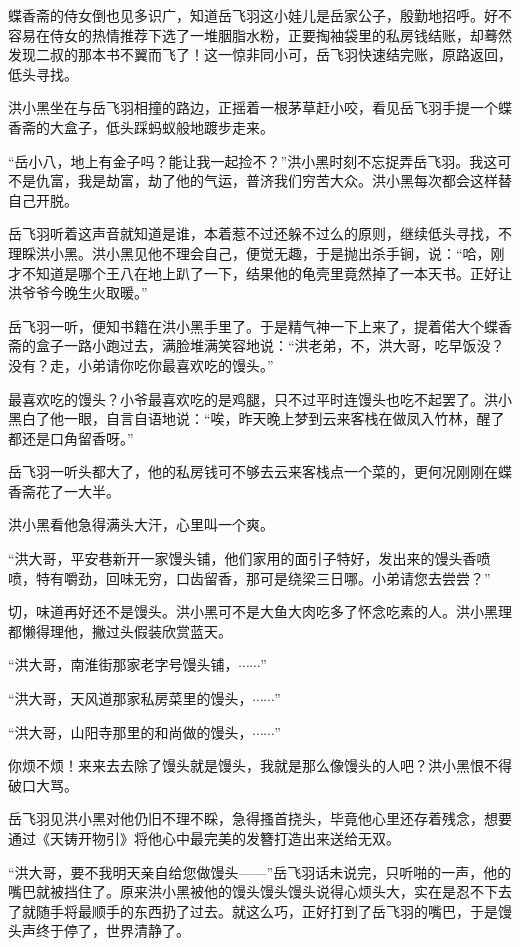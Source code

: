 蝶香斋的侍女倒也见多识广，知道岳飞羽这小娃儿是岳家公子，殷勤地招呼。好不容易在侍女的热情推荐下选了一堆胭脂水粉，正要掏袖袋里的私房钱结账，却蓦然发现二叔的那本书不翼而飞了！这一惊非同小可，岳飞羽快速结完账，原路返回，低头寻找。

洪小黑坐在与岳飞羽相撞的路边，正摇着一根茅草赶小咬，看见岳飞羽手提一个蝶香斋的大盒子，低头踩蚂蚁般地踱步走来。

“岳小八，地上有金子吗？能让我一起捡不？”洪小黑时刻不忘捉弄岳飞羽。我这可不是仇富，我是劫富，劫了他的气运，普济我们穷苦大众。洪小黑每次都会这样替自己开脱。

岳飞羽听着这声音就知道是谁，本着惹不过还躲不过么的原则，继续低头寻找，不理睬洪小黑。洪小黑见他不理会自己，便觉无趣，于是抛出杀手锏，说：“哈，刚才不知道是哪个王八在地上趴了一下，结果他的龟壳里竟然掉了一本天书。正好让洪爷爷今晚生火取暖。”

岳飞羽一听，便知书籍在洪小黑手里了。于是精气神一下上来了，提着偌大个蝶香斋的盒子一路小跑过去，满脸堆满笑容地说：“洪老弟，不，洪大哥，吃早饭没？没有？走，小弟请你吃你最喜欢吃的馒头。”

最喜欢吃的馒头？小爷最喜欢吃的是鸡腿，只不过平时连馒头也吃不起罢了。洪小黑白了他一眼，自言自语地说：“唉，昨天晚上梦到云来客栈在做凤入竹林，醒了都还是口角留香呀。”

岳飞羽一听头都大了，他的私房钱可不够去云来客栈点一个菜的，更何况刚刚在蝶香斋花了一大半。

洪小黑看他急得满头大汗，心里叫一个爽。

“洪大哥，平安巷新开一家馒头铺，他们家用的面引子特好，发出来的馒头香喷喷，特有嚼劲，回味无穷，口齿留香，那可是绕梁三日哪。小弟请您去尝尝？”

切，味道再好还不是馒头。洪小黑可不是大鱼大肉吃多了怀念吃素的人。洪小黑理都懒得理他，撇过头假装欣赏蓝天。

“洪大哥，南淮街那家老字号馒头铺，$\cdots\cdots$”

“洪大哥，天风道那家私房菜里的馒头，$\cdots\cdots$”

“洪大哥，山阳寺那里的和尚做的馒头，$\cdots\cdots$”

你烦不烦！来来去去除了馒头就是馒头，我就是那么像馒头的人吧？洪小黑恨不得破口大骂。

岳飞羽见洪小黑对他仍旧不理不睬，急得搔首挠头，毕竟他心里还存着残念，想要通过《天铸开物引》将他心中最完美的发簪打造出来送给无双。

“洪大哥，要不我明天亲自给您做馒头------”岳飞羽话未说完，只听啪的一声，他的嘴巴就被挡住了。原来洪小黑被他的馒头馒头馒头说得心烦头大，实在是忍不下去了就随手将最顺手的东西扔了过去。就这么巧，正好打到了岳飞羽的嘴巴，于是馒头声终于停了，世界清静了。


